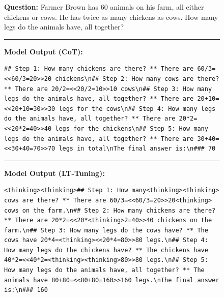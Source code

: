 \documentclass{article}
\theoremstyle{plain}
\theoremstyle{definition}
\theoremstyle{remark}
\begin{document}


\begin{figure}[h]
\centering
\begin{tcolorbox}[colback=blue!5, colframe=blue!50, title=Example 2]
\textbf{Question:} Farmer Brown has 60 animals on his farm, all either chickens or cows. He has twice as many chickens as cows. How many legs do the animals have, all together?

\rule{\linewidth}{0.7pt}

\textbf{Model Output (CoT):}

\begin{lstlisting}
## Step 1: How many chickens are there? ** There are 60/3=<<60/3=20>>20 chickens\n## Step 2: How many cows are there? ** There are 20/2=<<20/2=10>>10 cows\n## Step 3: How many legs do the animals have, all together? ** There are 20+10=<<20+10=30>>30 legs for the cows\n## Step 4: How many legs do the animals have, all together? ** There are 20*2=<<20*2=40>>40 legs for the chickens\n## Step 5: How many legs do the animals have, all together? ** There are 30+40=<<30+40=70>>70 legs in total\nThe final answer is:\n### 70
\end{lstlisting}
\rule{\linewidth}{0.7pt}
\textbf{Model Output (LT-Tuning):}
\begin{lstlisting}
<thinking><thinking>## Step 1: How many<thinking><thinking> cows are there? ** There are 60/3=<<60/3=20>>20<thinking> cows on the farm.\n## Step 2: How many chickens are there? ** There are 20*2=<<20*<thinking>2=40>>40 chickens on the farm.\n## Step 3: How many legs do the cows have? ** The cows have 20*4=<thinking><<20*4=80>>80 legs.\n## Step 4: How many legs do the chickens have? ** The chickens have 40*2=<<40*2=<thinking><thinking>80>>80 legs.\n## Step 5: How many legs do the animals have, all together? ** The animals have 80+80=<<80+80=160>>160 legs.\nThe final answer is:\n### 160
\end{lstlisting}
\end{tcolorbox}
\label{fig:example2}
\end{figure}

\end{document}
